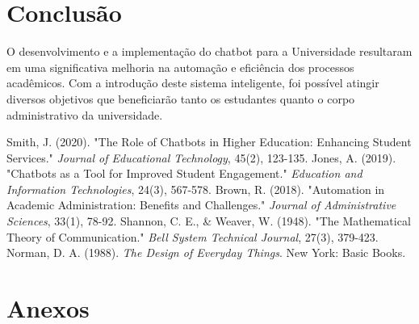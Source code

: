 \documentclass[12pt,a4paper]{article} %
\begin{document}
\section{Conclusão}

\noindent O desenvolvimento e a implementação do chatbot para a Universidade resultaram em uma significativa melhoria na automação e eficiência dos processos acadêmicos. Com a introdução deste sistema inteligente, foi possível atingir diversos objetivos que beneficiarão tanto os estudantes quanto o corpo administrativo da universidade.

\newpage

\begin{thebibliography}{99}
 Smith, J. (2020). "The Role of Chatbots in Higher Education: Enhancing Student Services." \textit{Journal of Educational Technology}, 45(2), 123-135.
 Jones, A. (2019). "Chatbots as a Tool for Improved Student Engagement." \textit{Education and Information Technologies}, 24(3), 567-578.
 Brown, R. (2018). "Automation in Academic Administration: Benefits and Challenges." \textit{Journal of Administrative Sciences}, 33(1), 78-92.
 Shannon, C. E., \& Weaver, W. (1948). "The Mathematical Theory of Communication." \textit{Bell System Technical Journal}, 27(3), 379-423.
 Norman, D. A. (1988). \textit{The Design of Everyday Things}. New York: Basic Books.
\end{thebibliography}

\newpage

\appendix
\section{Anexos}

\end{document}
